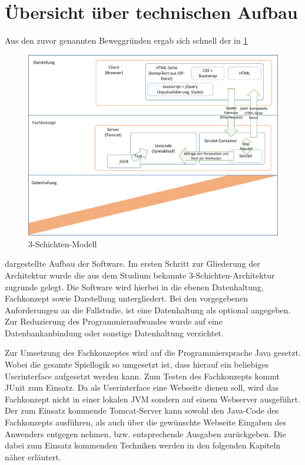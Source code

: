 \section{Übersicht über technischen Aufbau}
Aus den zuvor genannten Beweggründen ergab sich schnell der in \ref{fig:abb29} 
\begin{figure}[!h]
	\centering
	\includegraphics[scale=0.2]{img/3-schichten-modell.jpeg}
	\caption{3-Schichten-Modell} \label{fig:abb29}
\end{figure}
dargestellte Aufbau der Software. Im ersten Schritt zur Gliederung der Architektur wurde die aus dem Studium bekannte 3-Schichten-Architektur zugrunde gelegt. Die Software wird hierbei in die ebenen Datenhaltung, Fachkonzept sowie Darstellung untergliedert. Bei den vorgegebenen Anforderungen an die Fallstudie, ist eine Datenhaltung als optional angegeben. Zur Reduzierung des Programmieraufwandes wurde auf eine Datenbankanbindung oder sonstige Datenhaltung verzichtet.

Zur Umsetzung des Fachkonzeptes wird auf die Programmiersprache Java gesetzt. Wobei die gesamte Spiellogik so umgesetzt ist, dass hierauf ein beliebiges Userinterface aufgesetzt werden kann. Zum Testen des Fachkonzepts kommt JUnit zum Einsatz. Da als Userinterface eine Webseite dienen soll, wird das Fachkonzept nicht in einer lokalen JVM sondern auf einem Webserver ausgeführt. Der zum Einsatz kommende Tomcat-Server kann sowohl den Java-Code des Fachkonzepts ausführen, als auch über die gewünschte Webseite Eingaben des Anwenders entgegen nehmen, bzw. entsprechende Ausgaben zurückgeben. Die dabei zum Einsatz kommenden Techniken werden in den folgenden Kapiteln näher erläutert.

